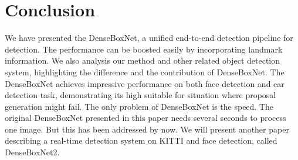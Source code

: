 \section{Conclusion}

We have presented the DenseBoxNet, a unified end-to-end detection pipeline for detection. The performance can be boosted easily by incorporating landmark information. We also analysis our method and other related object detection system, highlighting the difference and the contribution of DenseBoxNet.  The DenseBoxNet achieves impressive performance on both face detection and car detection task, demonstrating its high suitable for situation where proposal generation might fail. The only problem of DenseBoxNet is the speed.  The original DenseBoxNet presented in this paper needs several seconds to process one image. But this has been addressed by now.  We will present another paper describing a real-time detection system on KITTI and face detection, called DenseBoxNet2.  

